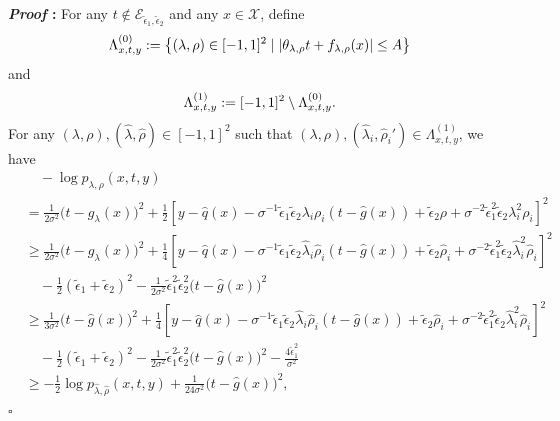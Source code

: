 \documentclass[10pt,a4paper]{amsart}
\def\eps{{\epsilon}}
\def\gE{{\mathcal{E}}}
\def\gX{{\mathcal{X}}}
\renewenvironment{proof}{\noindent\textbf{\textit{Proof }:}}{\hfill$\square$}
\begin{document}
\begin{proof}
    For any $t\notin\gE_{\tilde{\eps}_1,\tilde{\eps}_2}$ and any $x\in\gX$, define
    \begin{equation}
        \notag
        \Lambda_{x,t,y}^{(0)} := \left\{ (\lambda,\rho)\in[-1,1]^2 \mid \left|\theta_{\lambda,\rho}t+f_{\lambda,\rho}(x)\right| \leq A \right\}
    \end{equation}
    and
    \begin{equation}
        \notag
        \Lambda_{x,t,y}^{(1)} := [-1,1]^2 \setminus \Lambda_{x,t,y}^{(0)}.
    \end{equation}
    For any $(\lambda,\rho), (\hat{\lambda},\hat{\rho}) \in[-1,1]^2$ such that $(\lambda,\rho), (\hat{\lambda}_i,\hat{\rho}_i') \in \Lambda_{x,t,y}^{(1)}$, we have
    \begin{subequations}
        \label{eq:bad-density-bound}
        \begin{align}
            &\quad -\log p_{\lambda,\rho}(x,t,y)\\
            &=  \frac{1}{2\sigma^2}\big(t-g_{\lambda}(x)\big)^2 + \frac{1}{2}\left[y-\hat{q}(x)-\sigma^{-1}\tilde{\eps}_1\tilde{\eps}_2\lambda_i\rho_i(t-\hat{g}(x))+\tilde{\eps}_2\rho+\sigma^{-2}\tilde{\eps}_1^2\tilde{\eps}_2\lambda_i^2\rho_i\right]^2 \label{eq:bad-density-bound-1} \\ 
            &\geq  \frac{1}{2\sigma^2}\big(t-g_{\lambda}(x)\big)^2 + \frac{1}{4}\left[y-\hat{q}(x)-\sigma^{-1}\tilde{\eps}_1\tilde{\eps}_2\hat{\lambda}_i\hat{\rho}_i(t-\hat{g}(x))+\tilde{\eps}_2\hat{\rho}_i+\sigma^{-2}\tilde{\eps}_1^2\tilde{\eps}_2\hat{\lambda}_i^2\hat{\rho}_i\right]^2 \nonumber \\
            &\quad - \frac{1}{2} (\tilde{\eps}_1+\tilde{\eps}_2)^2 - \frac{1}{2\sigma^2}\tilde{\eps}_1^2\tilde{\eps}_2^2\big(t-\hat{g}(x)\big)^2 \label{eq:bad-density-bound-2} \\
            &\geq   \frac{1}{3\sigma^2}\big(t-\hat{g}(x)\big)^2 + \frac{1}{4}\left[y-\hat{q}(x)-\sigma^{-1}\tilde{\eps}_1\tilde{\eps}_2\hat{\lambda}_i\hat{\rho}_i(t-\hat{g}(x))+\tilde{\eps}_2\hat{\rho}_i+\sigma^{-2}\tilde{\eps}_1^2\tilde{\eps}_2\hat{\lambda}_i^2\hat{\rho}_i\right]^2 \nonumber \\
            &\quad - \frac{1}{2} (\tilde{\eps}_1+\tilde{\eps}_2)^2 - \frac{1}{2\sigma^2}\tilde{\eps}_1^2\tilde{\eps}_2^2\big(t-\hat{g}(x)\big)^2 -\frac{4\tilde{\eps}_1^2}{\sigma^2} \label{eq:bad-density-bound-3} \\
            &\geq -\frac{1}{2}\log p_{\hat{\lambda},\hat{\rho}}(x,t,y) + \frac{1}{24\sigma^2}\big(t-\hat{g}(x)\big)^2, \label{eq:bad-density-bound-4}

\end{align}
\end{subequations}
\end{proof}
\end{document}
